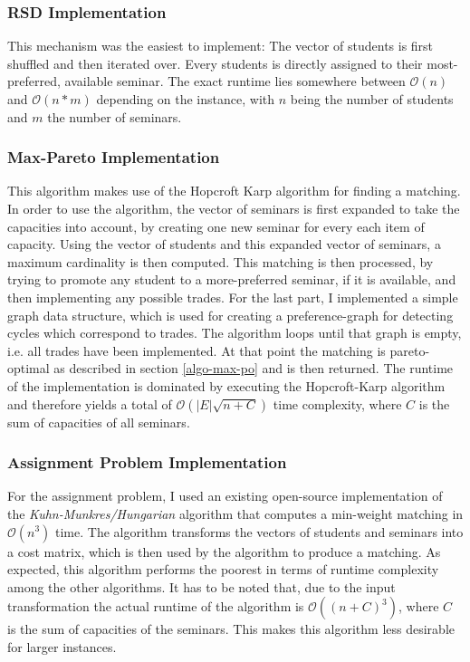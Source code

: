 \subsubsection{RSD Implementation}
This mechanism was the easiest to implement: The vector of students is first shuffled and then iterated over. Every students is directly assigned to their most-preferred, available seminar. The exact runtime lies somewhere between $\mathcal{O}(n)$ and $\mathcal{O}(n * m)$ depending on the instance, with $n$ being the number of students and $m$ the number of seminars.

\subsubsection{Max-Pareto Implementation}\label{impl:maxpo}
This algorithm makes use of the Hopcroft Karp algorithm for finding a matching. In order to use the algorithm, the vector of seminars is first expanded to take the capacities into account, by creating one new seminar for every each item of capacity. Using the vector of students and this expanded vector of seminars, a maximum cardinality is then computed. This matching is then processed, by trying to promote any student to a more-preferred seminar, if it is available, and then implementing any possible trades. For the last part, I implemented a simple graph data structure, which is used for creating a preference-graph for detecting cycles which correspond to trades. The algorithm loops until that graph is empty, i.e. all trades have been implemented. At that point the matching is pareto-optimal as described in section \ref{algo-max-po} and is then returned. The runtime of the implementation is dominated by executing the Hopcroft-Karp algorithm and therefore yields a total of $\mathcal{O}(|E|\sqrt{n+C})$ time complexity, where $C$ is the sum of capacities of all seminars.

\subsubsection{Assignment Problem Implementation}
For the assignment problem, I used an existing open-source implementation of the \textit{Kuhn-Munkres/Hungarian} algorithm that computes a min-weight matching in $\mathcal{O}(n^3)$ time\cite{HungarianGithub}. The algorithm transforms the vectors of students and seminars into a cost matrix, which is then used by the algorithm to produce a matching. As expected, this algorithm performs the poorest in terms of runtime complexity among the other algorithms. It has to be noted that, due to the input transformation the actual runtime of the algorithm is $\mathcal{O}((n + C)^3)$, where $C$ is the sum of capacities of the seminars. This makes this algorithm less desirable for larger instances.

